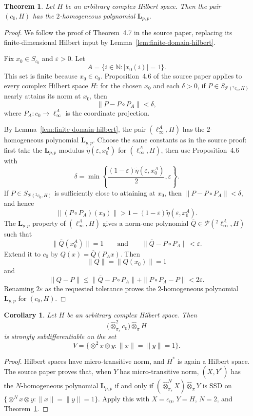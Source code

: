 \documentclass[11pt]{article}
\newtheorem{theorem}{Theorem}
\newtheorem{corollary}{Corollary}
\newcommand{\N}{\mathbb N}
\newcommand{\cP}{\mathcal P}
\newcommand{\pten}{\widehat{\otimes}_{\pi}}
\newcommand{\sten}[1]{\widehat{\otimes}_{\pi_s}^{#1}}
\newcommand{\Lpp}{\mathbf L_{p,p}}
\begin{document}
\begin{theorem}\label{thm:c0-hilbert}
Let \(H\) be an arbitrary complex Hilbert space.  Then the pair \((c_0,H)\)
has the \(2\)-homogeneous polynomial \(\Lpp\).
\end{theorem}

\begin{proof}
We follow the proof of Theorem~4.7 in the source paper, replacing its
finite-dimensional Hilbert input by Lemma~\ref{lem:finite-domain-hilbert}.

Fix \(x_0\in S_{c_0}\) and \(\varepsilon>0\).  Let
\[
  A=\{i\in\N: |x_0(i)|=1\}.
\]
This set is finite because \(x_0\in c_0\).  Proposition~4.6 of the source
paper applies to every complex Hilbert space \(H\): for the chosen \(x_0\) and
each \(\delta>0\), if \(P\in S_{\cP(^2 c_0,H)}\) nearly attains its norm at
\(x_0\), then
\[
  \|P-P\circ P_A\|<\delta,
\]
where \(P_A:c_0\to \ell_\infty^A\) is the coordinate projection.

By Lemma~\ref{lem:finite-domain-hilbert}, the pair \((\ell_\infty^A,H)\) has
the \(2\)-homogeneous polynomial \(\Lpp\).  Choose the same constants as in the
source proof: first take the \(\Lpp\) modulus
\(\widetilde\eta(\varepsilon,x_0^A)\) for \((\ell_\infty^A,H)\), then use
Proposition~4.6 with
\[
  \delta=\min\left\{ \frac{(1-\varepsilon)\widetilde\eta(\varepsilon,x_0^A)}{2},
  \varepsilon\right\}.
\]
If \(P\in S_{\cP(^2 c_0,H)}\) is sufficiently close to attaining at \(x_0\),
then \(\|P-P\circ P_A\|<\delta\), and hence
\[
  \|(P\circ P_A)(x_0)\|
  > 1-(1-\varepsilon)\widetilde\eta(\varepsilon,x_0^A).
\]
The \(\Lpp\) property of \((\ell_\infty^A,H)\) gives a norm-one polynomial
\(\overline Q\in\cP(^2\ell_\infty^A,H)\) such that
\[
  \|\overline Q(x_0^A)\|=1
  \qquad\text{and}\qquad
  \|\overline Q-P\circ P_A\|<\varepsilon .
\]
Extend it to \(c_0\) by \(Q(x)=\overline Q(P_Ax)\).  Then
\[
  \|Q\|=\|Q(x_0)\|=1
\]
and
\[
  \|Q-P\|
  \le \|\overline Q-P\circ P_A\|+\|P\circ P_A-P\|
  <2\varepsilon .
\]
Renaming \(2\varepsilon\) as the requested tolerance proves the
\(2\)-homogeneous polynomial \(\Lpp\) for \((c_0,H)\).
\end{proof}

\begin{corollary}\label{cor:tensor-ssd}
Let \(H\) be an arbitrary complex Hilbert space.  Then
\[
  \bigl(\sten{2} c_0\bigr)\pten H
\]
is strongly subdifferentiable on the set
\[
  V=\{\otimes^2 x\otimes y:\|x\|=\|y\|=1\}.
\]
\end{corollary}

\begin{proof}
Hilbert spaces have micro-transitive norm, and \(H^*\) is again a Hilbert
space.  The source paper proves that, when \(Y\) has micro-transitive norm,
\((X,Y^*)\) has the \(N\)-homogeneous polynomial \(\Lpp\) if and only if
\((\sten{N}X)\pten Y\) is SSD on
\(\{\otimes^N x\otimes y:\|x\|=\|y\|=1\}\).  Apply this with
\(X=c_0\), \(Y=H\), \(N=2\), and Theorem~\ref{thm:c0-hilbert}.
\end{proof}
\end{document}
